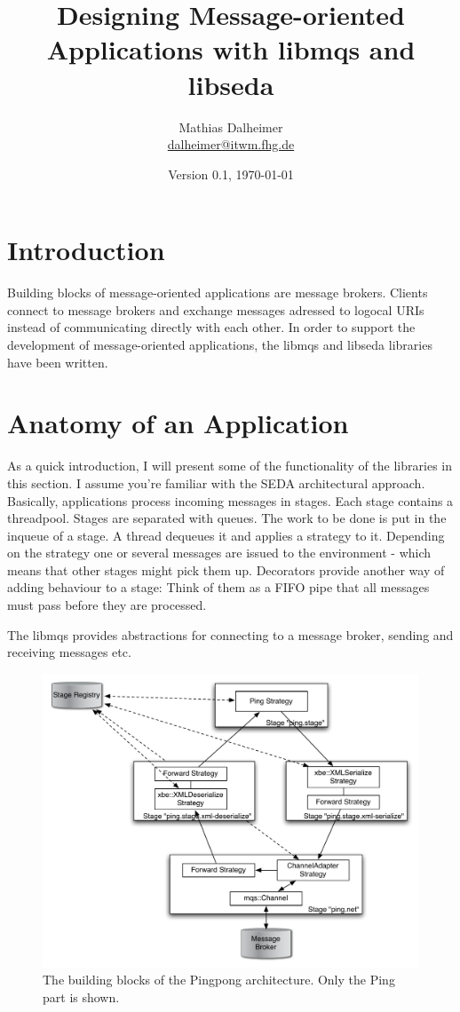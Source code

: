 \documentclass[11pt]{article}
\title{\textsf{Designing Message-oriented Applications with libmqs and
libseda}}
\author{ Mathias Dalheimer\\
\url{dalheimer@itwm.fhg.de}}
\date{Version 0.1, \today\\
}
\begin{document}
\ifpdf
{}
\else
{}
\fi

\maketitle


\tableofcontents

\section{Introduction}\label{sec:introduction}
Building blocks of message-oriented applications are message brokers.
Clients connect to message brokers and exchange messages adressed to
logocal URIs instead of communicating directly with each other. In order
to support the development of message-oriented applications, the libmqs
and libseda libraries have been written.

\section{Anatomy of an Application}\label{sec:anatomy of an application}
As a quick introduction, I will present some of the functionality of the
libraries in this section. I assume you're familiar with the SEDA
architectural approach. Basically, applications process incoming
messages in stages. Each stage contains a threadpool. Stages are
separated with queues. The work to be done is put in the inqueue of a
stage. A thread dequeues it and applies a strategy to it. Depending on
the strategy one or several messages are issued to the environment -
which means that other stages might pick them up. Decorators provide
another way of adding behaviour to a stage: Think of them as a FIFO pipe
that all messages must pass before they are processed.

The libmqs provides abstractions for connecting to a message broker,
sending and receiving messages etc.
\begin{figure}[htbp]
  \begin{center}
    \includegraphics[width=12cm]{MQS-SEDA-Architecture.pdf}
    \caption{The building blocks of the Pingpong architecture. Only
    the Ping part is shown.}
    \label{fig:mqs-seda-architecture}
  \end{center}
\end{figure}
\end{document}
